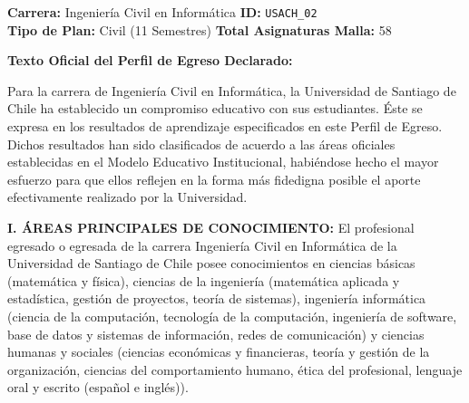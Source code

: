 \documentclass[11pt,a4paper]{article}
\begin{document}
\begin{tcolorbox}[fichaStyle, title={UNIVERSIDAD 02: Universidad de Santiago de Chile (USACH) --- Civil}]
\small\sffamily
\textbf{Carrera:} Ingeniería Civil en Informática \hfill \textbf{ID:} \texttt{USACH\_02} \\
\textbf{Tipo de Plan:} Civil (11 Semestres) \hfill \textbf{Total Asignaturas Malla:} 58

\tcbline

\textbf{Texto Oficial del Perfil de Egreso Declarado:}\\[4pt]
{\small\rmfamily
Para la carrera de Ingeniería Civil en Informática, la Universidad de Santiago de Chile ha establecido un compromiso educativo con sus estudiantes. Éste se expresa en los resultados de aprendizaje especificados en este Perfil de Egreso. Dichos resultados han sido clasificados de acuerdo a las áreas oficiales establecidas en el Modelo Educativo Institucional, habiéndose hecho el mayor esfuerzo para que ellos reflejen en la forma más fidedigna posible el aporte efectivamente realizado por la Universidad.

\vspace{4pt}\noindent\textbf{I. ÁREAS PRINCIPALES DE CONOCIMIENTO:}
El profesional egresado o egresada de la carrera Ingeniería Civil en Informática de la Universidad de Santiago de Chile posee conocimientos en ciencias básicas (matemática y física), ciencias de la ingeniería (matemática aplicada y estadística, gestión de proyectos, teoría de sistemas), ingeniería informática (ciencia de la computación, tecnología de la computación, ingeniería de software, base de datos y sistemas de información, redes de comunicación) y ciencias humanas y sociales (ciencias económicas y financieras, teoría y gestión de la organización, ciencias del comportamiento humano, ética del profesional, lenguaje oral y escrito (español e inglés)).

}
\end{tcolorbox}
\end{document}
